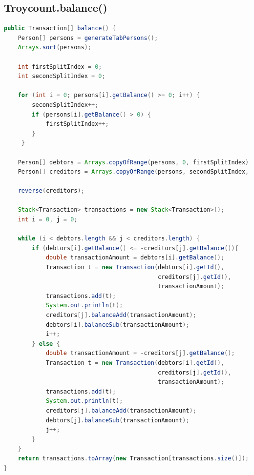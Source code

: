 \documentclass[12pt, a4paper, table]{article}
\begin{document}
\subsection*{Troycount.balance()}

\begin{lstlisting}[language=Java]
public Transaction[] balance() {
    Person[] persons = generateTabPersons();
    Arrays.sort(persons);

    int firstSplitIndex = 0;
    int secondSplitIndex = 0;

    for (int i = 0; persons[i].getBalance() >= 0; i++) {
    	secondSplitIndex++;
    	if (persons[i].getBalance() > 0) {
    		firstSplitIndex++;
        }
     }

    Person[] debtors = Arrays.copyOfRange(persons, 0, firstSplitIndex);
    Person[] creditors = Arrays.copyOfRange(persons, secondSplitIndex, persons.length);

    reverse(creditors);

    Stack<Transaction> transactions = new Stack<Transaction>();
    int i = 0, j = 0;

    while (i < debtors.length && j < creditors.length) {
        if (debtors[i].getBalance() <= -creditors[j].getBalance()){
            double transactionAmount = debtors[i].getBalance();
            Transaction t = new Transaction(debtors[i].getId(),
                                            creditors[j].getId(),
                                            transactionAmount);
            transactions.add(t);
            System.out.println(t);
            creditors[j].balanceAdd(transactionAmount);
            debtors[i].balanceSub(transactionAmount);
            i++;
        } else {
            double transactionAmount = -creditors[j].getBalance();
            Transaction t = new Transaction(debtors[i].getId(),
                                            creditors[j].getId(),
                                            transactionAmount);
            transactions.add(t);
            System.out.println(t);
            creditors[j].balanceAdd(transactionAmount);
            debtors[j].balanceSub(transactionAmount);
            j++;
		}
	}
    return transactions.toArray(new Transaction[transactions.size()]);
}
\end{lstlisting}
\newpage
\end{document}
